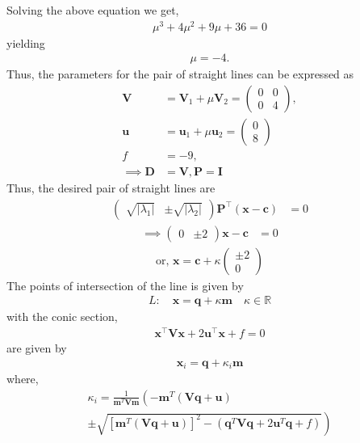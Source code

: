 \documentclass[10pt,a4paper]{report}
\newcommand{\myvec}[1]{\ensuremath{\begin{pmatrix}#1\end{pmatrix}}}
\let\vec\mathbf
\providecommand{\abs}[1]{\left\vert#1\right\vert}
\let\vec\mathbf
\providecommand{\brak}[1]{\ensuremath{\left(#1\right)}}
\providecommand{\lbrak}[1]{\ensuremath{\left(#1\right.}}
\providecommand{\rbrak}[1]{\ensuremath{\left.#1\right)}}
\providecommand{\sbrak}[1]{\ensuremath{{}\left[#1\right]}}
\begin{document}
\begin{multicols}{2}
Solving the above equation we get, 
\begin{align}
\mu^3 + 4\mu^2 + 9\mu + 36=0
\end{align}
yielding
\begin{align}
    \mu = -4.
\end{align}
 Thus, the parameters for the pair of  straight lines can be expressed as 
 \begin{align}
	\vec{V} &= 
\vec{V}_1 + \mu\vec{V}_2
=\myvec{ 0 & 0 \\ 0 & 4},
\\
	\vec{u} &=
\vec{u}_1+\mu \vec{u}_2
	= \myvec{
0\\
8
    }
\\
	f&=-9,
	\\
	\implies \vec{D} &= \vec{V}, \vec{P} = \vec{I}
    \end{align}
    \iffalse
Thus, the desired pair of straight lines are \\ 
\begin{align} 
	\myvec{\sqrt{\abs{\lambda_1}} & \pm \sqrt{\abs{\lambda_2}}}\vec{P}^{\top}\brak{\vec{x}-\vec{c}} &= 0
\end{align}
\begin{align}
	\implies\myvec{0 & \pm 2}\vec{x}-\vec{c} &= 0
\end{align}
\begin{align}
	\text{or, }\vec{x} =\vec{c} + \kappa \myvec{\pm 2 \\ 0}
\end{align} 
\iffalse
The points of intersection of the line is given by  
\begin{align}
L: \quad \vec{x} = \vec{q} + \kappa \vec{m} \quad \kappa \in \mathbb{R}
\end{align}
with the conic section, \\ 
\begin{align}
	\vec{x}^{\top}\vec{V}\vec{x} + 2\vec{u}^{\top} \vec{x} + f = 0
\end{align}
are given by \\
\begin{align}
\vec{x}_i = \vec{q} + \kappa_i \vec{m}
\end{align}
where, \\
{\tiny
\begin{multline}
\kappa_i = \frac{1}
{
\vec{m}^T\vec{V}\vec{m}
}
\lbrak{-\vec{m}^T\brak{\vec{V}\vec{q}+\vec{u}}}
\\
\pm
\rbrak{\sqrt{
\sbrak{
\vec{m}^T\brak{\vec{V}\vec{q}+\vec{u}}
}^2
-
\brak
{
\vec{q}^T\vec{V}\vec{q} + 2\vec{u}^T\vec{q} +f
}}}
\end{multline}}
\end{multicols}
\end{document}
